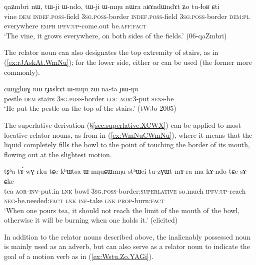 \begin{exe}
\ex \label{ex:tWji.WmNu.Wndo}
\gll  qaʑmbri nɯ, tɯ-ji ɯ-ndo, tɯ-ji ɯ-mŋu nɯra aʁɤndɯndɤt ʑo tu-ɬoʁ ɕti \\
vine \textsc{dem} \textsc{indef}.\textsc{poss}-field \textsc{3sg}.\textsc{poss}-border \textsc{indef}.\textsc{poss}-field \textsc{3sg}.\textsc{poss}-border \textsc{dem}:\textsc{pl} everywhere \textsc{emph} \textsc{ipfv}:\textsc{up}-come.out be.\textsc{aff}:\textsc{fact} \\
\glt `The vine, it grows everywhere, on both sides of the fields.' (06-qaZmbri)
\end{exe}


The relator noun   can also designates the top extremity of stairs, as in (\ref{ex:rJAskAt.WmNu}); for the lower side, either  or  can be used (the former more commonly).

\begin{exe}
\ex \label{ex:rJAskAt.WmNu}
\gll  cɯŋglɯɣ nɯ rɟɤskɤt ɯ-mŋu zɯ na-ta ɲɯ-ŋu \\
 pestle \textsc{dem} stairs \textsc{3sg}.\textsc{poss}-border \textsc{loc} \textsc{aor}:3\flobv{}-put \textsc{sens}-be \\
 \glt `He put the pestle on the top of the stairs.' (tWJo 2005)
\end{exe} 

The superlative derivation (§\ref{sec:superlative.XCWX}) can be applied to most locative relator nouns, as  from   in (\ref{ex:WmNuCWmNu}), where it means that the liquid completely fills the bowl to the point of touching the border of its mouth, flowing out at the slightest motion.

\begin{exe}
\ex \label{ex:WmNuCWmNu}
\gll  tʂʰa tɤ́-wɣ-rku tɕe kʰɯtsa ɯ-mŋuɕɯmŋu stʰɯci tu-zɣɯt mɤ-ra ma kɤ-ndo tɕe sɤ-ɕke \\
tea \textsc{aor}-\textsc{inv}-put.in \textsc{lnk} bowl \textsc{3sg}.\textsc{poss}-border:\textsc{superlative} so.much \textsc{ipfv}:\textsc{up}-reach \textsc{neg}-be.needed:\textsc{fact} \textsc{lnk} \textsc{inf}-take \textsc{lnk} \textsc{prop}-burn:\textsc{fact} \\
\glt `When one pours tea, it should not reach the limit of the mouth of the bowl, otherwise it will be burning when one holds it.' (elicited)
\end{exe} 

In addition to the relator nouns described above, the inalienably possessed noun  is mainly used as an adverb, but can also serve as a relator noun to indicate the goal of a motion verb as in (\ref{ex:Wstu.Zo.YAGi}).


